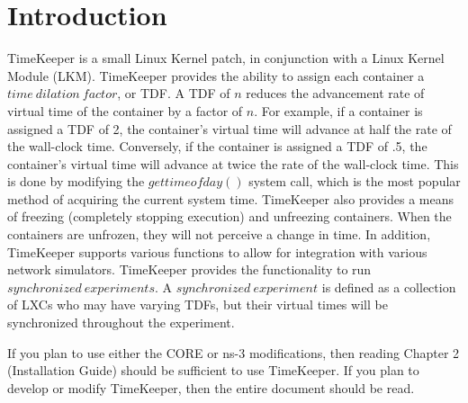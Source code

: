 \chapter{Introduction}
TimeKeeper is a small Linux Kernel patch, in conjunction with a Linux Kernel Module (LKM). TimeKeeper provides the ability to assign each container a $time\ dilation\ factor$, or TDF. A TDF of $n$ reduces the advancement rate of virtual time of the container by a factor of $n$. For example, if a container is assigned a TDF of 2, the container's virtual time will advance at half the rate of the wall-clock time. Conversely, if the container is assigned a TDF of .5, the container's virtual time will advance at twice the rate of the wall-clock time. This is done by modifying the $gettimeofday()$ system call, which is the most popular method of acquiring the current system time. TimeKeeper also provides a means of freezing (completely stopping execution) and unfreezing containers. When the containers are unfrozen, they will not perceive a change in time. In addition, TimeKeeper supports various functions to allow for integration with various network simulators. TimeKeeper provides the functionality to run $synchronized\ experiments$. A $synchronized\ experiment$ is defined as a collection of LXCs who may have varying TDFs, but their virtual times will be synchronized throughout the experiment.


If you plan to use either the CORE or ns-3 modifications, then reading Chapter 2 (Installation Guide) should be sufficient to use TimeKeeper. If you plan to develop or modify TimeKeeper, then the entire document should be read. 
